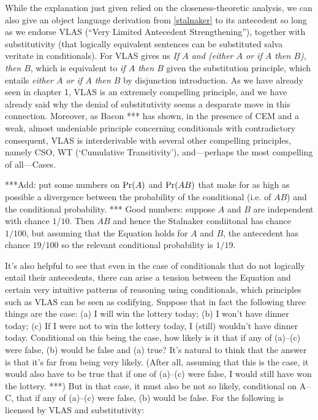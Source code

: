 \documentclass[If.tex]{subfiles}
\begin{document}
%

While the explanation just given relied on the closeness-theoretic analysis, we can also give an object language derivation from \ref{stalnaker} to its antecedent so long as we endorse VLAS (“Very Limited Antecedent Strengthening”), together with substitutivity (that logically equivalent sentences can be substituted salva veritate in conditionals).  For VLAS gives us \emph{If $A$ and (either $A$ or if $A$ then $B$), then $B$}, which is equivalent to \emph{if $A$ then $B$} given the substitution principle, which entails \emph{either $A$ or if $A$ then $B$} by disjunction introduction.  As we have already seen in chapter 1, VLAS is an extremely compelling principle, and we have already said why the denial of substitutivity seems a desparate move in this connection.  Moreover, as Bacon *** has shown, in the presence of CEM and a weak, almost undeniable principle concerning conditionals with contradictory consequent, VLAS is interderivable with several other compelling principles, namely CSO, WT (‘Cumulative Transitivity’), and---perhaps the most compelling of all---Cases.  

***Add: put some numbers on $\operatorname{Pr}(A)$ and $\operatorname{Pr}(AB)$ that make for as high as possible a divergence between the probability of the conditional (i.e. of $AB$) and the conditional probability.  
*** Good numbers: suppose $A$ and $B$ are independent with chance $1/10$.  Then $AB$ and hence the Stalnaker condiitonal has chance $1/100$, but assuming that the Equation holds for $A$ and $B$, the antecedent has chance $19/100$ so the relevant conditional probability is $1/19$.  


It's also helpful to see that even in the case of conditionals that do not logically entail their antecedents, there can arise a tension between the Equation and certain very intuitive patterns of reasoning using conditionals, which principles such as VLAS can be seen as codifying.  Suppose that in fact the following three things are the case: (a) I will win the lottery today; (b) I won't have dinner today; (c) If I were not to win the lottery today, I (still) wouldn't have dinner today.  Conditional on this being the case, how likely is it that if any of (a)--(c) were false, (b) would be false and (a) true?  It's natural to think that the answer is that it's far from being very likely.  (After all, assuming that this is the case, it would also have to be true that if one of (a)--(c) were false, I would still have won the lottery.  ***)  But in that case, it must also be not so likely, conditional on A--C, that if any of (a)--(c) were false, (b) would be false.  For the following is licensed by VLAS and substitutivity:
\end{document}
